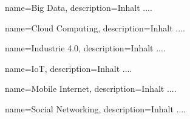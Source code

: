 \makeglossaries




{
	name=Big Data,
	description={Inhalt ....}
}


{
	name=Cloud Computing,
	description={Inhalt ....}
}


{
	name=Industrie 4.0,
	description={Inhalt ....}
}


{
	name=IoT,
	description={Inhalt ....}
}


{
	name=Mobile Internet,
	description={Inhalt ....}
}


{
	name=Social Networking,
	description={Inhalt ....}
}



